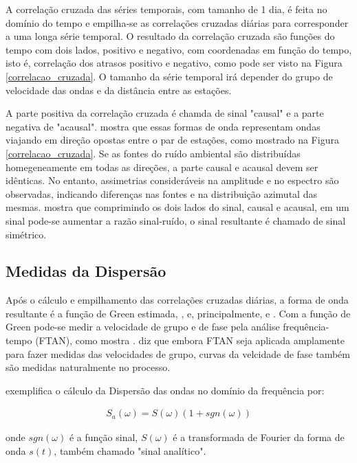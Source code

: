A correlação cruzada das séries temporais, com tamanho de 1 dia, é feita no domínio do tempo e empilha-se as correlações cruzadas diárias para corresponder a uma longa série temporal. 
O resultado da correlação cruzada são funções do tempo com dois lados, positivo e negativo, com coordenadas em função do tempo, isto é, correlação dos atrasos positivo e negativo, como pode ser visto na Figura \ref{correlacao_cruzada}. O tamanho da série temporal irá depender do grupo de velocidade das ondas e da distância entre as estações.

A parte positiva da correlação cruzada é chamda de sinal "causal" e a parte negativa de "acausal". \cite{bensen_processing_2007} mostra que essas formas de onda representam ondas viajando em direção opostas entre o par de estações, como mostrado na Figura \ref{correlacao_cruzada}. Se as fontes do ruído ambiental são distribuídas homegeneamente em todas as direções, a parte causal e acausal devem ser idênticas. No entanto, assimetrias consideráveis na amplitude e no espectro são observadas, indicando diferenças nas fontes e na distribuição azimutal das mesmas. \cite{bensen_processing_2007} mostra que comprimindo os dois lados do sinal, causal e acausal, em um sinal pode-se aumentar a razão sinal-ruído, o sinal resultante é chamado de sinal simétrico.

\subsection{Medidas da Dispersão}

Após o cálculo e empilhamento das correlações cruzadas diárias, a forma de onda resultante é a função de Green estimada, \cite{campillo_long-range_2003}, \cite{shapiro_emergence_2004} e, principalmente, \cite{wapenaar_retrieving_2004} e \cite{bensen_processing_2007}. Com a função de Green pode-se medir a velocidade de grupo e de fase pela análise frequência-tempo (FTAN), como mostra \cite{levshin_automated_2001}. \cite{bensen_processing_2007} diz que embora FTAN seja aplicada amplamente para fazer medidas das velocidades de grupo, curvas da velcidade de fase também são medidas naturalmente no processo.

\cite{bensen_processing_2007} exemplifica o cálculo da Dispersão das ondas no domínio da frequência por:

\begin{eqnarray}
S_{a}(\omega) = S(\omega)(1 + sgn(\omega))
\end{eqnarray}

onde $sgn(\omega)$ é a função sinal, $S(\omega)$ é a transformada de Fourier da forma de onda $s(t)$, também chamado "sinal analítico".

